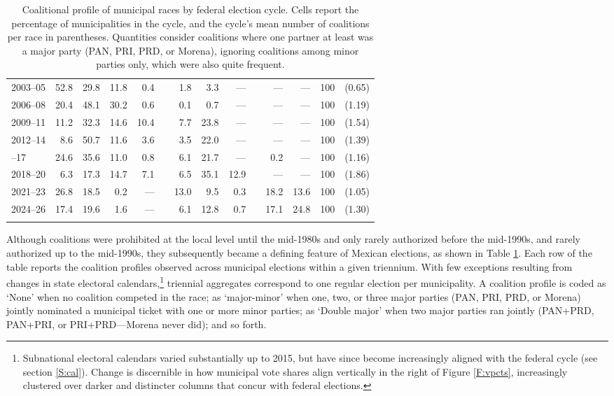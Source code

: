 \documentclass[letter,12pt]{article}
\begin{document}
\begin{table}
{\begin{tabular}{lrrrrrrrrrrrrc}
 2003--05&  52.8&  29.8&   11.8&    0.4&&    1.8&       3.3&         ---&&  ---&       ---& 100 & (0.65) \\
 2006--08&  20.4&  48.1&   30.2&    0.6&&    0.1&       0.7&         ---&&  ---&       ---& 100 & (1.19) \\
 2009--11&  11.2&  32.3&   14.6&   10.4&&    7.7&      23.8&         ---&&  ---&       ---& 100 & (1.54) \\
 2012--14&   8.6&  50.7&   11.6&    3.6&&    3.5&      22.0&         ---&&  ---&       ---& 100 & (1.39) \\ \hdashline
 2015--17&  24.6&  35.6&   11.0&    0.8&&    6.1&      21.7&         ---&&  0.2&       ---& 100 & (1.16) \\
 2018--20&   6.3&  17.3&   14.7&    7.1&&    6.5&      35.1&        12.9&&  ---&       ---& 100 & (1.86) \\
 2021--23&  26.8&  18.5&    0.2&    ---&&   13.0&       9.5&         0.3&& 18.2&      13.6& 100 & (1.05) \\
 2024--26&  17.4&  19.6&    1.6&    ---&&    6.1&      12.8&         0.7&& 17.1&      24.8& 100 & (1.30) \\ 
         &      &      &       &       &&       &          &            &&     &          &       &        \\ [-1.8ex] 
  \hline
\end{tabular}
}
\caption{Coalitional profile of municipal races by federal election cycle. Cells report the percentage of municipalities in the cycle, and the cycle's mean number of coalitions per race in parentheses. Quantities consider coalitions where one partner at least was a major party (PAN, PRI, PRD, or Morena), ignoring coalitions among minor parties only, which were also quite frequent.}\label{T:coal}
\end{table}

Although coalitions were prohibited at the local level until the mid-1980s and only rarely authorized before the mid-1990s, and rarely authorized up to the mid-1990s, they subsequently became a defining feature of Mexican elections, as shown in Table \ref{T:coal}. Each row of the table reports the coalition profiles observed across municipal elections within a given triennium. With few exceptions resulting from changes in state electoral calendars,\footnote{Subnational electoral calendars varied substantially up to 2015, but have since become increasingly aligned with the federal cycle (see section \ref{S:cal}). Change is discernible in how municipal vote shares align vertically in the right of Figure \ref{F:vpcts}, increasingly clustered over darker and distincter columns that concur with federal elections.} triennial aggregates correspond to one regular election per municipality. A coalition profile is coded as `None' when no coalition competed in the race; as `major-minor' when one, two, or three major parties (PAN, PRI, PRD, or Morena) jointly nominated a municipal ticket with one or more minor parties; as `Double major' when two major parties ran jointly (PAN+PRD, PAN+PRI, or PRI+PRD---Morena never did); and so forth.
\end{document}
